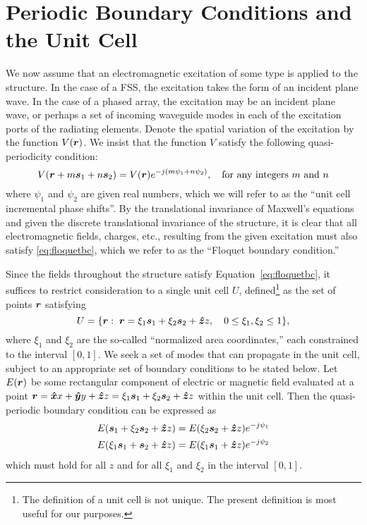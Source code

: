 \section{Periodic Boundary Conditions and the Unit Cell}
\label{sec:pbcuc}
We now assume that an electromagnetic excitation of some type is
applied to the structure.  In the case of a FSS, the excitation takes
the form of an incident plane wave.  In the case of a phased array,
the excitation may be an incident plane wave, or perhaps a set of
incoming waveguide modes in each of the excitation ports of the
radiating elements.  Denote the spatial variation of the excitation by
the function $V(\boldsymbol{r})$.  We insist that the function $V$ satisfy the
following quasi-periodicity condition:
\begin{equation}
  \label{eq:floquetbc}
  V(\boldsymbol{r} + m\boldsymbol{s}_1 + n\boldsymbol{s}_2) = V(\boldsymbol{r}) e^{-j(m\psi_1 + n\psi_2)}, \quad
  \text{for any integers $m$ and $n$}
\end{equation}
where $\psi_1$ and $\psi_2$ are given real numbers, which we will
refer to as the ``unit cell incremental phase shifts''.  By the
translational invariance of Maxwell's equations and given the discrete
translational invariance of the structure, it is clear that all
electromagnetic fields, charges, etc., resulting from the given
excitation must also satisfy \eqref{eq:floquetbc}, which we refer to
as the ``Floquet boundary condition.''

Since the fields throughout the structure satisfy
Equation~\eqref{eq:floquetbc}, it suffices to restrict consideration
to a single unit cell $U$, defined\footnote{The definition of a unit
  cell is not unique.  The present definition is most useful for our
  purposes.}
as the set of points $\boldsymbol{r}$
satisfying
\begin{equation}
  \label{eq:unitcell}
  U = \{\boldsymbol{r}: \; \boldsymbol{r} = \xi_1 \boldsymbol{s}_1 + \xi_2 \boldsymbol{s}_2 + \boldsymbol{\hat{z}} z, \quad 0 \leq \xi_1 , \xi_2
  \leq 1\},
\end{equation}
where $\xi_1$ and $\xi_2$ are the so-called ``normalized area
coordinates,'' each constrained to the interval $[0,1]$.
We seek a set of modes that can propagate in the unit cell, subject to
an appropriate set of boundary conditions to be stated below.  Let
$E(\boldsymbol{r})$ be some rectangular component of electric or magnetic field
evaluated at a point $\boldsymbol{r} = \boldsymbol{\hat{x}} x + \boldsymbol{\hat{y}} y + \boldsymbol{\hat{z}} z = \xi_1 \boldsymbol{s}_1 + \xi_2
\boldsymbol{s}_2 + \boldsymbol{\hat{z}} z$ within the unit cell.  
Then the quasi-periodic boundary condition can be expressed as
\begin{subequations}
  \label{eq:cellfloquetbc}
  \begin{align}
    E(\boldsymbol{s}_1 + \xi_2 \boldsymbol{s}_2 + \boldsymbol{\hat{z}} z) &= E(\xi_2 \boldsymbol{s}_2 + \boldsymbol{\hat{z}} z) e^{-j\psi_1} \\
    E(\xi_1 \boldsymbol{s}_1 + \boldsymbol{s}_2 + \boldsymbol{\hat{z}} z) &= E(\xi_1 \boldsymbol{s}_1 + \boldsymbol{\hat{z}} z) e^{-j\psi_2} 
  \end{align}
\end{subequations}
  which must hold for all $z$ and for all $\xi_1$ and $\xi_2$ in the
  interval $[0,1]$.  
